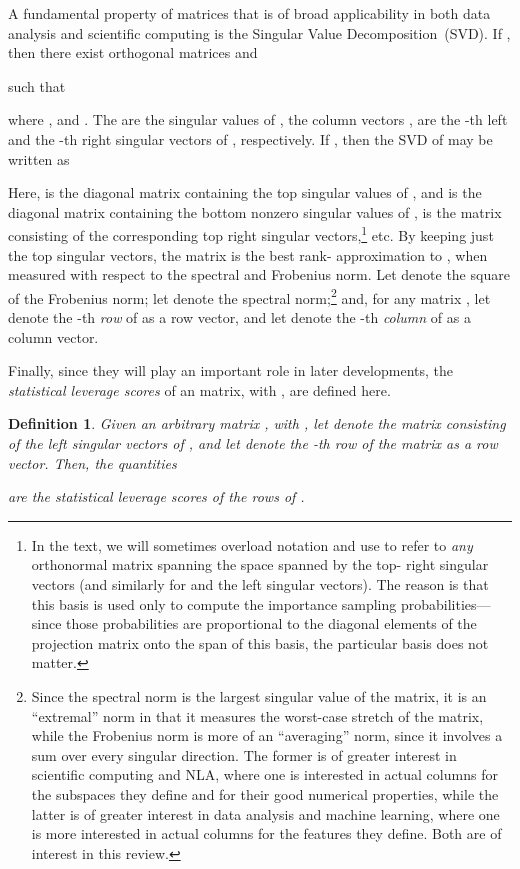 \documentclass[twoside]{article}
\newtheorem{definition}{Definition}
\begin{document}
A fundamental property of matrices that is of broad applicability in both 
data analysis and scientific computing is the Singular Value 
Decomposition~(SVD).
If , then there exist orthogonal matrices
 and 

such that

where ,  and 
.  
The  are the singular values of , the column vectors ,  
are the -th left and the -th right singular vectors of , 
respectively.
If , then the SVD of  may be written as

Here,  is the  diagonal matrix containing the top  
singular values of , and
 is the  
diagonal matrix containing the bottom  nonzero singular values of , 
 is the  matrix consisting of the corresponding top 
right singular vectors,\footnote{In the text, we will sometimes overload notation and use  
to refer to \emph{any}  orthonormal matrix spanning the space 
spanned by the top- right singular vectors (and similarly for  and 
the left singular vectors).  The reason is that this basis is used only to 
compute the importance sampling probabilities---since those probabilities 
are proportional to the diagonal elements of the projection matrix onto the 
span of this basis, the particular basis does not matter.}
etc.
By keeping just the top  singular vectors, the matrix 
 is the best rank- approximation to , when 
measured with respect to the spectral and Frobenius norm.
Let
 denote the square of 
the
Frobenius norm; let 
denote 
the
spectral norm;\footnote{Since the spectral norm is the largest singular value of the 
matrix, it is an ``extremal'' norm in that it measures the 
worst-case stretch of the matrix, while the Frobenius norm is more of an 
``averaging'' norm, since it involves a sum over every singular direction.
The former is of greater interest in scientific computing and NLA, where one 
is interested in actual columns for the subspaces they define and for their 
good numerical properties, while the latter is of greater interest in data 
analysis and machine learning, where one is more interested in actual 
columns for the features they define.  Both are of interest in this review.}
and,
for any matrix , let  
denote the -th \emph{row} of  as a row vector, and let 
denote the -th \emph{column} of  as a column vector.

Finally, since they will play an important role in later developments, the 
\emph{statistical leverage scores} of an  matrix, with , 
are defined here.
\begin{definition}
\label{def:lev-scores}
Given an arbitrary  matrix , with , let  denote
the  matrix consisting of the  left singular vectors of ,
and let  denote the -th row of the matrix  as a row vector.
Then, the quantities 

are the \emph{statistical leverage scores} of the rows of .
\end{definition}
\end{document}

